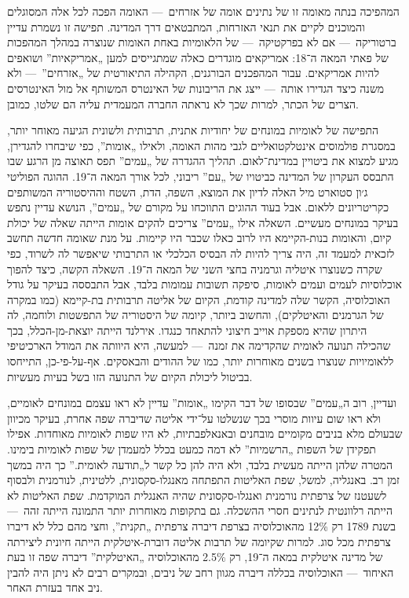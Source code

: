 המהפיכה בנתה מאומה זו של נתינים אומה של אזרחים~— האומה הפכה לכל אלה המסוגלים והמוכנים לקיים את תנאי האזרחות, המתבטאים דרך המדינה. תפישה זו נשמרת עדיין ברטוריקה~— אם לא בפרקטיקה~— של הלאומיות באחת האומות שנוצרה במהלך המהפכות של פאתי המאה ה־18: אמריקאים מוגדרים כאלה שמתגייסים למען „אמריקאיות” ושואפים להיות אמריקאים. עבור המהפכנים הבורגנים, הקהילה התיאורטית של „אזרחים”~— ולא משנה כיצד הגדירו אותה~— ייצג את הריבונות של האינטרס המשותף אל מול האינטרסים הצרים של הכתר, למרות שכך לא נראתה החברה המעמדית עליה הם שלטו, כמובן.

התפישה של לאומיות במונחים של יחודיות אתנית, תרבותית ולשונית הגיעה מאוחר יותר, במסגרת פולמוסים אינטלקטואליים לגבי מהות האומה, ולאילו „אומות”, כפי שיבחרו להגדירן, מגיע למצוא את ביטויין במדינת־לאום. תהליך ההגדרה של „עמים” תפס תאוצה מן הרגע שבו התבסס העקרון של המדינה כביטויו של „עם” ריבוני, לכל אורך המאה ה־19. ההוגה הפוליטי ג׳ון סטוארט מיל האלה לדיון את המוצא, השפה, הדת, השטח וההיסטוריה המשותפים כקריטריונים ללאום. אבל בעוד ההוגים התווכחו על מקורם של „עמים”, הנושא עדיין נתפש בעיקר במונחים מעשיים. השאלה אילו „עמים” צריכים להקים אומות הייתה שאלה של יכולת קיום, והאומות בנות-הקיימא היו לרוב כאלו שכבר היו קיימות. על מנת שאומה חדשה תחשב לזכאית למעמד זה, היה צריך להיות לה הבסיס הכלכלי או התרבותי שיאפשר לה לשרוד, כפי שקרה כשנוצרו איטליה וגרמניה בחצי השני של המאה ה־19. השאלה הקשה, כיצד להפוך אוכלוסיות לעמים ועמים לאומות, סיפקה תשובות עמומות בלבד, אבל התבססה בעיקר על גודל האוכלוסיה, הקשר שלה למדינה קודמת, הקיום של אליטה תרבותית בת-קיימא (כמו במקרה של הגרמנים והאיטלקים), והחשוב ביותר, קיומה של היסטוריה של התפשטות ולוחמה, לה היתרון שהיא מספקת אוייב חיצוני להתאחד כנגדו. אירלנד הייתה יוצאת-מן-הכלל, בכך שהכילה תנועה לאומית שהקדימה את זמנה~— למעשה, היא היוותה את המודל הארכיטיפי ללאומיויות שנוצרו בשנים מאוחרות יותר, כמו של ההודים והבאסקים. אף-על-פי-כן, התייחסו בביטול ליכולת הקיום של התנועה הזו בשל בעיות מעשיות.

ועדיין, רוב ה„עמים” שבסופו של דבר הקימו „אומות” עדיין לא ראו עצמם במונחים לאומיים, ולא ראו שום עיוות מוסרי בכך שנשלטו על־ידי אליטה שדיברה שפה אחרת, בעיקר מכיוון שבעולם מלא בניבים מקומיים מובחנים ובאנאלפבתיות, לא היו שפות לאומיות מאוחדות. אפילו תפקידן של השפות „הרשמיות” לא דמה כמעט בכלל למעמדן של שפות לאומיות בימינו. המטרה שלהן הייתה מעשית בלבד, ולא היה להן כל קשר ל„תודעה לאומית.” כך היה במשך זמן רב. באנגליה, למשל, שפת האליטות התפתחה מאנגלו-סקסונית, ללטינית, לנורמנית ולבסוף לשעטנז של צרפתית נורמנית ואנגלו-סקסונית שהיה האנגלית המוקדמת. שפת האליטות לא הייתה רלוונטית לנתינים חסרי ההשכלה. גם בתקופות מאוחרות יותר התמונה הייתה זהה~— בשנת 1789 רק 12\% מהאוכלוסיה בצרפת דיברה צרפתית „תקנית”, וחצי מהם כלל לא דיברו צרפתית מכל סוג. למרות שקיומה של תרבות אליטה דוברת-איטלקית הייתה חיונית ליצירתה של מדינה איטלקית במאה ה־19, רק 2.5\% מהאוכלוסיה „האיטלקית” דיברה שפה זו בעת האיחוד~— האוכלוסיה בכללה דיברה מגוון רחב של ניבים, ובמקרים רבים לא ניתן היה להבין ניב אחד בעזרת האחר.

